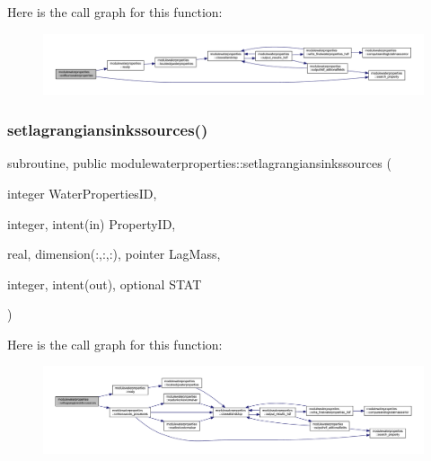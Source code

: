 Here is the call graph for this function\+:\nopagebreak
\begin{figure}[H]
\begin{center}
\leavevmode
\includegraphics[width=350pt]{namespacemodulewaterproperties_a5d755fdb3bd199311d38f1f88cbd7f10_cgraph}
\end{center}
\end{figure}
\mbox{\label{namespacemodulewaterproperties_a829c556b5c2c23f02481f958f56e77b2}} 
\subsubsection{\texorpdfstring{setlagrangiansinkssources()}{setlagrangiansinkssources()}}
{\footnotesize\ttfamily subroutine, public modulewaterproperties\+::setlagrangiansinkssources (\begin{DoxyParamCaption}\item[{integer}]{Water\+Properties\+ID,  }\item[{integer, intent(in)}]{Property\+ID,  }\item[{real, dimension(\+:,\+:,\+:), pointer}]{Lag\+Mass,  }\item[{integer, intent(out), optional}]{S\+T\+AT }\end{DoxyParamCaption})}

Here is the call graph for this function\+:\nopagebreak
\begin{figure}[H]
\begin{center}
\leavevmode
\includegraphics[width=350pt]{namespacemodulewaterproperties_a829c556b5c2c23f02481f958f56e77b2_cgraph}
\end{center}
\end{figure}
\mbox{\label{namespacemodulewaterproperties_abf8fd0a88a0f3e9bf66064666c864915}} 
